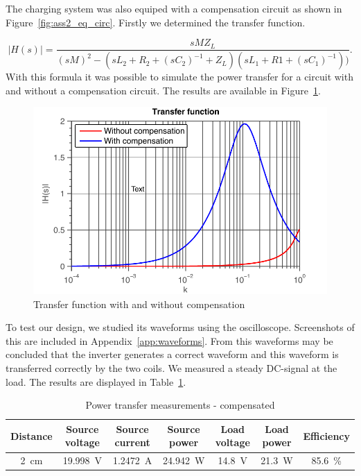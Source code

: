 \documentclass[11pt,titlepage]{report}
\begin{document}
The charging system was also equiped with a compensation circuit as shown in Figure~\ref{fig:ass2_eq_circ}. Firstly we determined the transfer function.

\begin{equation} \label{eq:ass3-transfer-function}
	|H(s)| = \frac{s M Z_L}{(s M)^2 - (s L_2 + R_2 + (s C_2)^{-1} + Z_L) ( s L_1 + R1 + (s C_1)^{-1}))} .
\end{equation}
With this formula it was possible to simulate the power transfer for a circuit with and without a compensation circuit. The results are available in Figure~\ref{fig:ass2-transfer-function}.

\begin{figure}[H]
	\begin{center}
		\includegraphics[width=0.8\linewidth]{resource/transfer-function-rc.pdf}
	\end{center}
	\caption{Transfer function with and without compensation}
	\label{fig:ass2-transfer-function}
\end{figure}


 To test our design, we studied its waveforms using the oscilloscope. Screenshots of this are included in Appendix~\ref{app:waveforms}. From this waveforms may be concluded that the inverter generates a correct waveform and this waveform is transferred correctly by the two coils. We measured a steady DC-signal at the load. The results are displayed in Table~\ref{tab:ass2_power}.


\begin{table}[H]
	\centering
	\begin{tabular}{c c c c c c c}
		\hline\hline
		Distance & Source voltage & Source current & Source power & Load voltage & Load power & Efficiency \\
		\hline
		\SI{2}{cm} & \SI{19.998}{V} & \SI{1.2472}{A} & \SI{24.942}{W} & \SI{14.8}{V} & \SI{21.3}{W} & \SI{85.6}{\percent} \\
		\hline
		\end{tabular}
			\caption{Power transfer measurements - compensated}
			\label{tab:ass2_power}
\end{table}
\end{document}
